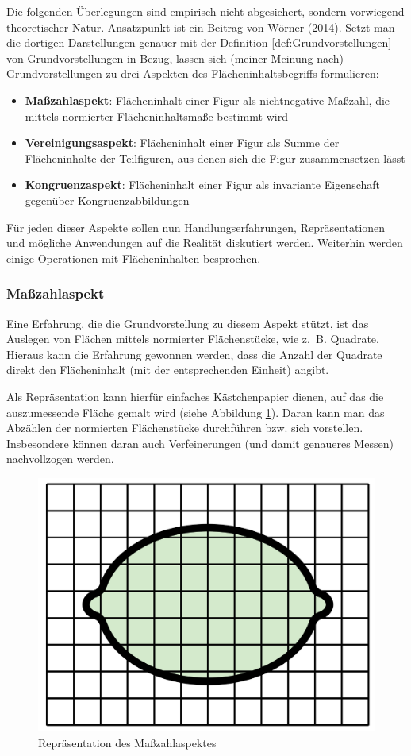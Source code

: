 \documentclass[
  ngerman,
]{scrbook}
\providecommand{\tightlist}{%
  \setlength{\itemsep}{0pt}\setlength{\parskip}{0pt}}
\theoremstyle{definition}
\theoremstyle{definition}
\theoremstyle{definition}
\theoremstyle{definition}
\theoremstyle{remark}
\begin{document}
Die folgenden Überlegungen sind empirisch nicht abgesichert, sondern vorwiegend theoretischer Natur. Ansatzpunkt ist ein Beitrag von \protect\hyperlink{ref-Worner2014}{Wörner} (\protect\hyperlink{ref-Worner2014}{2014}). Setzt man die dortigen Darstellungen genauer mit der Definition \ref{def:Grundvorstellungen} von Grundvorstellungen in Bezug, lassen sich (meiner Meinung nach) Grundvorstellungen zu drei Aspekten des Flächeninhaltsbegriffs formulieren:

\begin{itemize}
\tightlist
\item
  \textbf{Maßzahlaspekt}: Flächeninhalt einer Figur als nichtnegative Maßzahl, die mittels normierter Flächeninhaltsmaße bestimmt wird
\item
  \textbf{Vereinigungsaspekt}: Flächeninhalt einer Figur als Summe der Flächeninhalte der Teilfiguren, aus denen sich die Figur zusammensetzen lässt
\item
  \textbf{Kongruenzaspekt}: Flächeninhalt einer Figur als invariante Eigenschaft gegenüber Kongruenzabbildungen
\end{itemize}

Für jeden dieser Aspekte sollen nun Handlungserfahrungen, Repräsentationen und mögliche Anwendungen auf die Realität diskutiert werden. Weiterhin werden einige Operationen mit Flächeninhalten besprochen.

\hypertarget{mauxdfzahlaspekt}{%
\subsubsection{Maßzahlaspekt}\label{mauxdfzahlaspekt}}

Eine Erfahrung, die die Grundvorstellung zu diesem Aspekt stützt, ist das Auslegen von Flächen mittels normierter Flächenstücke, wie z.~B. Quadrate. Hieraus kann die Erfahrung gewonnen werden, dass die Anzahl der Quadrate direkt den Flächeninhalt (mit der entsprechenden Einheit) angibt.

Als Repräsentation kann hierfür einfaches Kästchenpapier dienen, auf das die auszumessende Fläche gemalt wird (siehe Abbildung \ref{fig:FlaecheMasszahl}). Daran kann man das Abzählen der normierten Flächenstücke durchführen bzw. sich vorstellen. Insbesondere können daran auch Verfeinerungen (und damit genaueres Messen) nachvollzogen werden.

\begin{figure}

{\centering \includegraphics[width=0.25\linewidth]{pictures/5-Masszahl} 

}

\caption{Repräsentation des Maßzahlaspektes}\label{fig:FlaecheMasszahl}
\end{figure}
\end{document}
